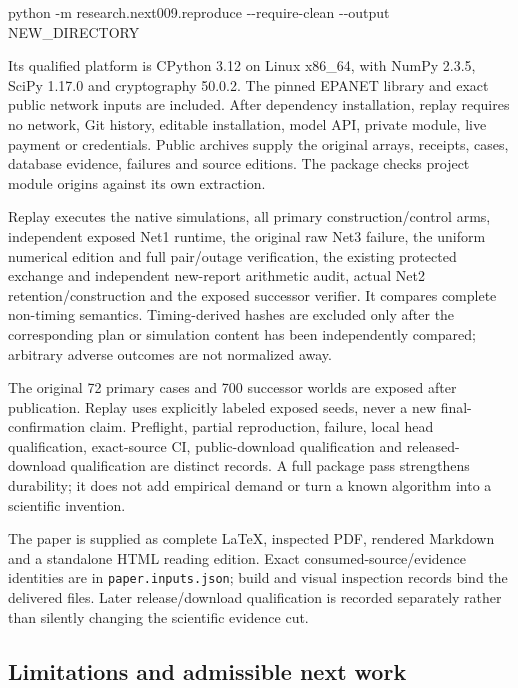 \documentclass[
  11pt,
]{article}
\newenvironment{Shaded}{}{}
\newcommand{\AttributeTok}[1]{\textcolor[rgb]{0.49,0.56,0.16}{#1}}
\newcommand{\ExtensionTok}[1]{#1}
\newcommand{\NormalTok}[1]{#1}
\begin{document}
\begin{Shaded}
\begin{Highlighting}[]
\ExtensionTok{python} \AttributeTok{{-}m}\NormalTok{ research.next009.reproduce }\AttributeTok{{-}{-}require{-}clean} \AttributeTok{{-}{-}output}\NormalTok{ NEW\_DIRECTORY}
\end{Highlighting}
\end{Shaded}

Its qualified platform is CPython 3.12 on Linux x86\_64, with NumPy
2.3.5, SciPy 1.17.0 and cryptography 50.0.2. The pinned EPANET library
and exact public network inputs are included. After dependency
installation, replay requires no network, Git history, editable
installation, model API, private module, live payment or credentials.
Public archives supply the original arrays, receipts, cases, database
evidence, failures and source editions. The package checks project
module origins against its own extraction.

Replay executes the native simulations, all primary construction/control
arms, independent exposed Net1 runtime, the original raw Net3 failure,
the uniform numerical edition and full pair/outage verification, the
existing protected exchange and independent new-report arithmetic audit,
actual Net2 retention/construction and the exposed successor verifier.
It compares complete non-timing semantics. Timing-derived hashes are
excluded only after the corresponding plan or simulation content has
been independently compared; arbitrary adverse outcomes are not
normalized away.

The original 72 primary cases and 700 successor worlds are exposed after
publication. Replay uses explicitly labeled exposed seeds, never a new
final-confirmation claim. Preflight, partial reproduction, failure,
local head qualification, exact-source CI, public-download qualification
and released-download qualification are distinct records. A full package
pass strengthens durability; it does not add empirical demand or turn a
known algorithm into a scientific invention.

The paper is supplied as complete LaTeX, inspected PDF, rendered
Markdown and a standalone HTML reading edition. Exact
consumed-source/evidence identities are in \texttt{paper.inputs.json};
build and visual inspection records bind the delivered files. Later
release/download qualification is recorded separately rather than
silently changing the scientific evidence cut.

\hypertarget{limitations-and-admissible-next-work}{%
\subsection{Limitations and admissible next
work}\label{limitations-and-admissible-next-work}}
\end{document}
